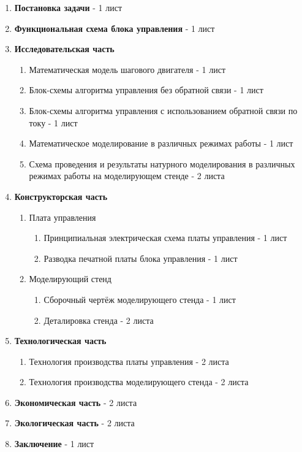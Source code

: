 \begin{enumerate}
    \item \textbf{Постановка задачи} - 1 лист
    \item \textbf{Функциональная схема блока управления} - 1 лист

    \item \textbf{Исследовательская часть}
    \begin{enumerate}
        \item Математическая модель шагового двигателя - 1 лист
        \item Блок-схемы алгоритма управления без обратной связи - 1 лист
        \item Блок-схемы алгоритма управления с использованием обратной связи по току - 1 лист
        \item Математическое моделирование в различных режимах работы - 1 лист
        \item Схема проведения и результаты натурного моделирования в различных режимах работы на моделирующем стенде - 2 листа
    \end{enumerate}

    \item \textbf{Конструкторская часть}
    \begin{enumerate}
        \item Плата управления
        \begin{enumerate}
            \item Принципиальная электрическая схема платы управления - 1 лист
            \item Разводка печатной платы блока управления - 1 лист
        \end{enumerate}
        \item Моделирующий стенд
        \begin{enumerate}
            \item Сборочный чертёж моделирующего стенда - 1 лист
            \item Деталировка стенда - 2 листа
        \end{enumerate}
    \end{enumerate}

    \item \textbf{Технологическая часть}
    \begin{enumerate}
        \item Технология производства платы управления - 2 листа
        \item Технология производства моделирующего стенда - 2 листа
    \end{enumerate}

    \item \textbf{Экономическая часть} - 2 листа
    \item \textbf{Экологическая часть} - 2 листа
    \item \textbf{Заключение} - 1 лист
\end{enumerate}

